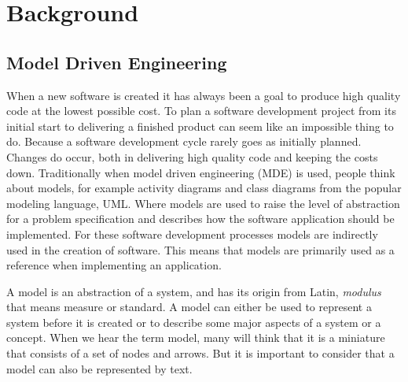 
\chapter{Background} %

\label{Chapter2} %


\section{Model Driven Engineering}
	
When a new software is created it has always been a goal to produce high
quality code at the lowest possible cost. To plan a software development project
from its initial start to delivering a finished product can seem like an impossible
thing to do. Because a software development cycle rarely goes as initially
planned. Changes do occur, both in delivering high quality code and keeping the
costs down. Traditionally when model driven engineering (MDE) is used, people
think about models, for example activity diagrams and class diagrams from the
popular modeling language, UML. Where models are used to raise the level
of abstraction for a problem specification and describes how the software
application should be implemented. For these software development processes
models are indirectly used in the creation of software. This means that models
are primarily used as a reference when implementing an application.

A model is an abstraction of a system, and has its origin from Latin,
\textit{modulus} that means measure or standard. A model can either be used to
represent a system before it is created or to describe some major aspects of a
system or a concept. When we hear the term model, many will think that it
is a miniature that consists of a set of nodes and arrows. But it is important
to consider that a model can also be represented by text. 

